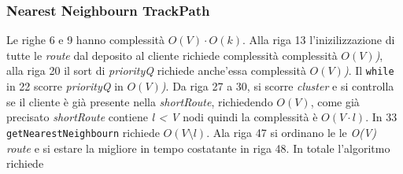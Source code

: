 \documentclass[]{article}
\begin{document}
\subsubsection{Nearest Neighbourn TrackPath}
Le righe 6 e 9 hanno complessità \emph{$O(V) \cdot O(k)$}. Alla riga 13 l'inizilizzazione di tutte le \emph{route} dal deposito al cliente richiede complessità complessità \emph{$O(V)$)}, alla riga  20 il sort di \textit{priorityQ} richiede anche'essa complessità \emph{$O(V)$)}. Il \texttt{while} in 22 scorre \textit{priorityQ} in  \emph{$O(V)$)}.
Da riga 27 a 30, si scorre \textit{cluster} e si controlla se il cliente è già presente nella \emph{shortRoute},  richiedendo   \emph{$O(V)$}, come già precisato \emph{shortRoute} contiene \emph{l < V} nodi quindi la complessità  è \emph{$O(V \cdot l)$}. In 33 \texttt{getNearestNeighbourn} richiede \emph{$O(V \setminus l)$}. Ala riga 47 si ordinano le le \emph{O(V)} \emph{route} e si estare la migliore in tempo costatante in riga 48. In totale l'algoritmo richiede
 



\end{document}
